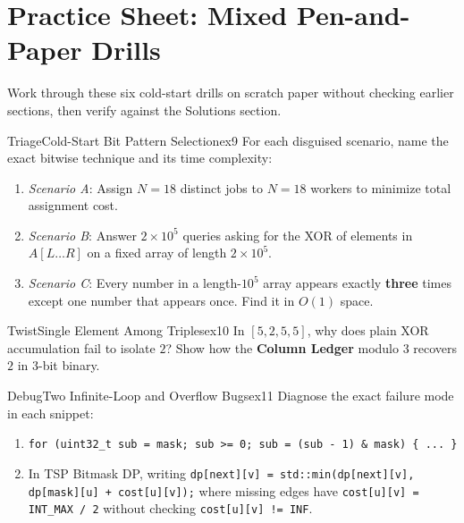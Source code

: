 \documentclass[11pt,a4paper]{article}
\theoremstyle{definition}
\begin{document}
\section*{Practice Sheet: Mixed Pen-and-Paper Drills}

Work through these six cold-start drills on scratch paper without checking earlier sections, then verify against the Solutions section.

\begin{tryitbox}{Triage}{Cold-Start Bit Pattern Selection}{ex9}
For each disguised scenario, name the exact bitwise technique and its time complexity:
\begin{enumerate}[itemsep=1pt, topsep=2pt]
    \item \emph{Scenario A}: Assign $N = 18$ distinct jobs to $N = 18$ workers to minimize total assignment cost.
    \item \emph{Scenario B}: Answer $2 \times 10^5$ queries asking for the XOR of elements in $A[L \dots R]$ on a fixed array of length $2 \times 10^5$.
    \item \emph{Scenario C}: Every number in a length-$10^5$ array appears exactly \textbf{three} times except one number that appears once. Find it in $O(1)$ space.
\end{enumerate}
\end{tryitbox}

\begin{tryitbox}{Twist}{Single Element Among Triples}{ex10}
In $[5, 2, 5, 5]$, why does plain XOR accumulation fail to isolate $2$? Show how the \textbf{Column Ledger} modulo $3$ recovers $2$ in 3-bit binary.
\end{tryitbox}

\begin{tryitbox}{Debug}{Two Infinite-Loop and Overflow Bugs}{ex11}
Diagnose the exact failure mode in each snippet:
\begin{enumerate}[itemsep=1pt, topsep=2pt]
    \item \texttt{for (uint32\_t sub = mask; sub >= 0; sub = (sub - 1) \& mask) \{ ... \}}
    \item In TSP Bitmask DP, writing \texttt{dp[next][v] = std::min(dp[next][v], dp[mask][u] + cost[u][v]);} where missing edges have \texttt{cost[u][v] = INT\_MAX / 2} without checking \texttt{cost[u][v] != INF}.
\end{enumerate}
\end{tryitbox}
\end{document}
